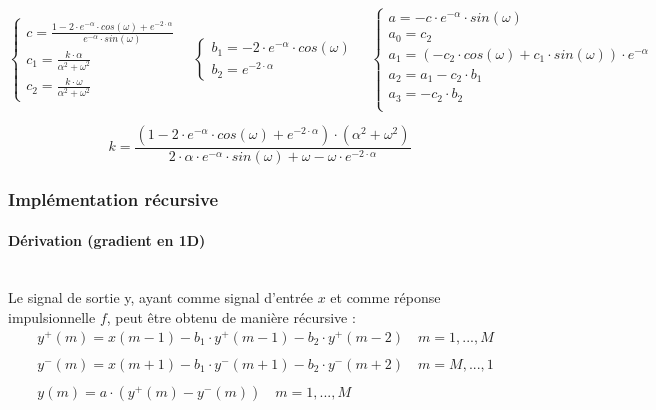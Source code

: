 \[ \left\{\begin{array}{ll}
c= \frac{1-2 \cdot e^{-\alpha} \cdot cos(\omega) + e^{-2 \cdot \alpha}}{e^{-\alpha} \cdot sin(\omega)} \\
c_1 = \frac{k \cdot \alpha}{\alpha^2 + \omega^2} \\
c_2 = \frac{k \cdot \omega}{\alpha^2 + \omega^2}
\end{array}\right.
\quad
\left\{\begin{array}{ll}
b_1 = -2 \cdot e^{-\alpha} \cdot cos(\omega) \\
b_2 = e^{-2 \cdot \alpha}
\end{array}\right.
\quad
\left\{\begin{array}{ll}
a = -c \cdot e^{-\alpha} \cdot sin(\omega) \\
a_0 = c_2 \\
a_1 = (-c_2 \cdot cos(\omega) + c_1 \cdot sin(\omega)) \cdot e^{-\alpha} \\
a_2 = a_1 - c_2 \cdot b_1 \\
a_3 = -c_2 \cdot b_2 \\
\end{array}\right. \]

\[ k = \frac{(1-2 \cdot e^{-\alpha} \cdot cos(\omega) + e^{-2 \cdot \alpha}) \cdot (\alpha^2 + \omega^2)}{2 \cdot \alpha \cdot e^{-\alpha} \cdot sin(\omega) + \omega - \omega \cdot e^{-2 \cdot \alpha}} \]

\subsubsection{Implémentation récursive}

\paragraph{Dérivation (gradient en 1D) \\\\}

Le signal de sortie y, ayant comme signal d'entrée $ x $ et comme réponse impulsionnelle $ f $, peut être obtenu de manière récursive :
\begin{align*}
& y^+(m) = x(m-1)-b_1 \cdot y^+(m-1)-b_2 \cdot y^+(m-2) \quad m=1,...,M \\
& \\
& y^-(m) = x(m+1)-b_1 \cdot y^-(m+1)-b_2 \cdot y^-(m+2) \quad m=M,...,1 \\
& \\
& y(m) = a \cdot (y^+(m) - y^-(m)) \quad m=1,...,M 
\end{align*}

